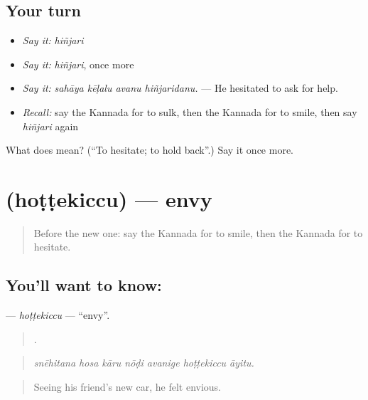 \subsection*{Your turn}
\begin{itemize}
\raggedright
  \item \emph{Say it:} \emph{hiñjari}
  \item \emph{Say it:} \emph{hiñjari}, once more
  \item \emph{Say it:} \emph{sahāya kēḷalu avanu hiñjaridanu.} — He hesitated to ask for help.
  \item \emph{Recall:} say the Kannada for to sulk, then the Kannada for to smile, then say \emph{hiñjari} again
\end{itemize}

\begin{tcolorbox}[breakable,colback=teal!4,colframe=teal!35!black,title={Before you move on}]
What does  mean? (\textquotedblleft{}To hesitate; to hold back\textquotedblright{}.) Say it once more.
\end{tcolorbox}
\section[\texorpdfstring{\kn{ಹೊಟ್ಟೆಕಿಚ್ಚು} (hoṭṭekiccu)}{ಹೊಟ್ಟೆಕಿಚ್ಚು (hoṭṭekiccu)}]{ (hoṭṭekiccu) — envy}

\label{lesson:KA-C499-hottekiccu}



\begin{quote}
Before the new one: say the Kannada for to smile, then the Kannada for to hesitate.
\end{quote}

\subsection*{You'll want to know: }
\textbf{} — \emph{hoṭṭekiccu} — \textquotedblleft{}envy\textquotedblright{}.

\begin{quote}
      .
\end{quote}

\begin{quote}
\emph{snēhitana hosa kāru nōḍi avanige hoṭṭekiccu āyitu.}
\end{quote}

\begin{quote}
Seeing his friend's new car, he felt envious.
\end{quote}

